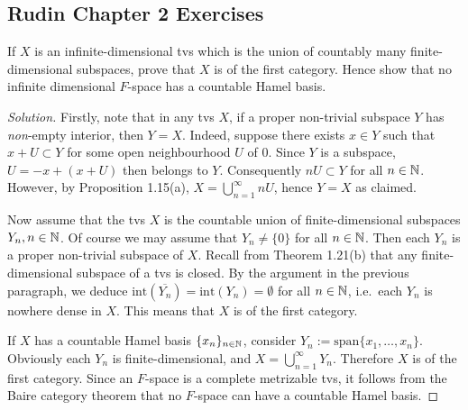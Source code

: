\subsection{Rudin Chapter 2 Exercises}

\begin{exercise}
	If $X$ is an infinite-dimensional tvs which is the union of countably many finite-dimensional subspaces, prove that $X$ is of the first category. Hence show that no infinite dimensional $F$-space has a countable Hamel basis.
\end{exercise}

\begin{proof}[Solution]
	Firstly, note that in any tvs $X$, if a proper non-trivial subspace $Y$ has \emph{non}-empty interior, then $Y = X$. Indeed, suppose there exists $x \in Y$ such that $x+U \subset Y$ for some open neighbourhood $U$ of 0. Since $Y$ is a subspace, $U = -x + (x+U)$ then belongs to $Y$. Consequently $nU \subset Y$ for all $n \in \mathbb{N}$. However, by Proposition 1.15(a), $X = \bigcup_{n=1}^\infty nU$, hence $Y=X$ as claimed.
	
	Now assume that the tvs $X$ is the countable union of finite-dimensional subspaces $Y_n, n \in \mathbb{N}$. Of course we may assume that $Y_n \ne \{0\}$ for all $n \in \mathbb{N}$. Then each $Y_n$ is a proper non-trivial subspace of $X$. Recall from Theorem 1.21(b) that any finite-dimensional subspace of a tvs is closed. By the argument in the previous paragraph, we deduce $\text{int}(\overline{Y_n}) = \text{int}(Y_n) = \emptyset$ for all $n \in \mathbb{N}$, i.e.\ each $Y_n$ is nowhere dense in $X$. This means that $X$ is of the first category.
	
	If $X$ has a countable Hamel basis $\{x_n\}_{n \in \mathbb{N}}$, consider $Y_n := \text{span}\{x_1, \ldots, x_n\}$. Obviously each $Y_n$ is finite-dimensional, and $X = \bigcup_{n=1}^\infty Y_n$. Therefore $X$ is of the first category. Since an $F$-space is a complete metrizable tvs, it follows from the Baire category theorem that no $F$-space can have a countable Hamel basis.
\end{proof}